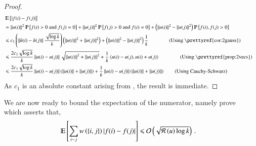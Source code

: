 \documentclass[11pt]{article}
\newcommand{\ralsymb}{\cR}
\newcommand{\ral}[1]{\ralsymb\left(#1\right)} %
\begin{document}
\begin{proof}

\begin{align*}
 & \Ex{  \Abs{f(i)  - f(j) } } \\
%
& = \norm{u(i)}^2 \Pr{ f(i) > 0 \textrm{ and }  f(j) = 0 } 
			+ \norm{u(j)}^2 \Pr{ f(j) > 0 \textrm{ and }
		f(i) = 0 } + \paren{\norm{u(i)}^2 - \norm{u(j)}^2} \Pr{ f(i),  f(j) > 0  } \\
%
%
		& \leq  c_1 \left( \norm{ \tilde{u}(i) - \tilde{u}(j) } \frac{\sqrt{\log k}}{k}  \right) \paren{\norm{u(i)}^2 + \norm{u(j)}^2}
		+ \paren{\norm{u(i)}^2 - \norm{u(j)}^2} \frac{1}{k}
		\qquad \qquad \textrm{(Using \prettyref{cor:2gauss})} \\
	& \leq \frac{2 c_1 \sqrt{\log k}}{k} \norm{u(i) - u(j)} \sqrt{\norm{u(i)}^2 + \norm{u(j)}^2 } + 
		\frac{1}{k} \inprod{ u(i) - u(j), u(i) + u(j)   }
		\qquad  \qquad \textrm{(Using \prettyref{prop:2vecs})} \\
	& \leq \frac{2 c_1 \sqrt{\log k}}{k} \norm{u(i) - u(j)}\paren{ \norm{u(i)} + \norm{u(j)} } +
		\frac{1}{k} \norm{u(i) - u(j)}\paren{ \norm{u(i)} + \norm{u(j)} }  \qquad \textrm{(Using Cauchy-Schwarz)}
\end{align*}
As $c_1$ is an absolute constant arising from ,
the result is immediate.
\end{proof}


We are now ready to bound the expectation of the numerator, namely
prove  which asserts that,
\[  \Ex{\sum_{i \sim j} w\paren{\set{i,j}} \Abs{f(i) - f(j) }}  \leq
	\cO\left(\sqrt{\ral{u} \log k}\right) \mper \]
\end{document}
